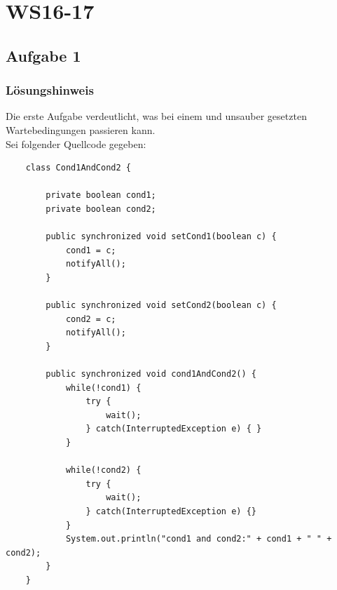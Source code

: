 \chapter{WS16-17}\label{ch:klausurws16-17}

\section{Aufgabe 1}
\subsection{Lösungshinweis}

Die erste Aufgabe verdeutlicht, was bei einem  und unsauber gesetzten Wartebedingungen passieren kann.\\
Sei folgender Quellcode gegeben:


\begin{verbatim}
    class Cond1AndCond2 {

        private boolean cond1;
        private boolean cond2;

        public synchronized void setCond1(boolean c) {
            cond1 = c;
            notifyAll();
        }

        public synchronized void setCond2(boolean c) {
            cond2 = c;
            notifyAll();
        }

        public synchronized void cond1AndCond2() {
            while(!cond1) {
                try {
                    wait();
                } catch(InterruptedException e) { }
            }

            while(!cond2) {
                try {
                    wait();
                } catch(InterruptedException e) {}
            }
            System.out.println("cond1 and cond2:" + cond1 + " " + cond2);
        }
    }
\end{verbatim}\\


